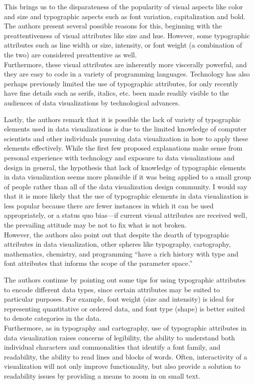 \documentclass[]{book}
\theoremstyle{definition}
\theoremstyle{definition}
\theoremstyle{definition}
\theoremstyle{remark}
\begin{document}
This brings us to the disparateness of the popularity of visual aspects
like color and size and typographic aspects such as font variation,
capitalization and bold. The authors present several possible reasons
for this, beginning with the preattentiveness of visual attributes like
size and hue. However, some typographic attributes such as line width or
size, intensity, or font weight (a combination of the two) are
considered preattentive as well.\\
Furthermore, these visual attributes are inherently more viscerally
powerful, and they are easy to code in a variety of programming
languages. Technology has also perhaps previously limited the use of
typographic attributes, for only recently have fine details such as
serifs, italics, etc. been made readily visible to the audiences of data
visualizations by technological advances.

Lastly, the authors remark that it is possible the lack of variety of
typographic elements used in data visualizations is due to the limited
knowledge of computer scientists and other individuals pursuing data
visualization in how to apply these elements effectively. While the
first few proposed explanations make sense from personal experience with
technology and exposure to data visualizations and design in general,
the hypothesis that lack of knowledge of typographic elements in data
visualization seems more plausible if it was being applied to a small
group of people rather than all of the data visualization design
community. I would say that it is more likely that the use of
typographic elements in data visualization is less popular because there
are fewer instances in which it can be used appropriately, or a status
quo bias---if current visual attributes are received well, the
prevailing attitude may be not to fix what is not broken.\\
However, the authors also point out that despite the dearth of
typographic attributes in data visualization, other spheres like
typography, cartography, mathematics, chemistry, and programming ``have
a rich history with type and font attributes that informs the scope of
the parameter space.''

The authors continue by pointing out some tips for using typographic
attributes to encode different data types, since certain attributes may
be suited to particular purposes. For example, font weight (size and
intensity) is ideal for representing quantitative or ordered data, and
font type (shape) is better suited to denote categories in the data.\\
Furthermore, as in typography and cartography, use of typographic
attributes in data visualization raises concerns of legibility, the
ability to understand both individual characters and commonalities that
identify a font family, and readability, the ability to read lines and
blocks of words. Often, interactivity of a visualization will not only
improve functionality, but also provide a solution to readability issues
by providing a means to zoom in on small text.
\end{document}
